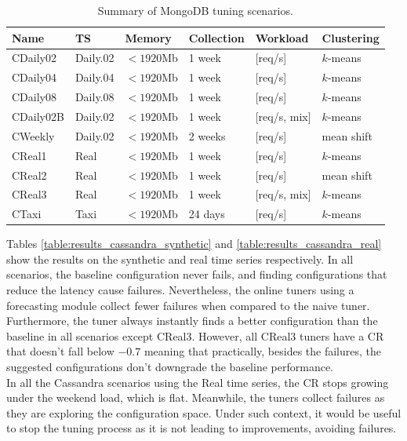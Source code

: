 \documentclass[a4paper, 12pt]{article} %
\newcommand{\ra}[1]{\renewcommand{\arraystretch}{#1}}
\begin{document}
	\begin{table}\centering 
		\ra{1.3}
		\begin{tabularx}{\textwidth}{@{}llllXX@{}}
			\midrule
			Name & TS & Memory & Collection & Workload & Clustering\\
			\midrule
			CDaily02&Daily.02 & $<1920$Mb  & 1 week & [req/s]  & $k$-means\\
			CDaily04&Daily.04 & $<1920$Mb  & 1 week & [req/s]  & $k$-means\\
			CDaily08&Daily.08 & $<1920$Mb  & 1 week & [req/s] & $k$-means\\
			CDaily02B&Daily.02 & $<1920$Mb  & 1 week & [req/s, mix] & $k$-means\\
			CWeekly&Daily.02 & $<1920$Mb  & 2 weeks & [req/s]  & mean shift\\
			CReal1&Real & $<1920$Mb  & 1 week & [req/s]  & $k$-means\\
			CReal2&Real & $<1920$Mb  & 1 week & [req/s]  & mean shift\\
			CReal3&Real & $<1920$Mb  & 1 week & [req/s, mix]  & $k$-means\\
			CTaxi &Taxi & $<1920$Mb  & 24 days & [req/s]  & $k$-means\\
			
			\bottomrule
		\end{tabularx}
		\caption{Summary of MongoDB tuning scenarios. }  \label{table:results_tuning_scenarios_cassandra}
	\end{table}
	
	Tables \ref{table:results_cassandra_synthetic} and \ref{table:results_cassandra_real} show the results on the synthetic and real time series respectively.
	In all scenarios, the baseline configuration never fails, and finding configurations that reduce the latency cause failures. Nevertheless, the online tuners using a forecasting module collect fewer failures when compared to the naive tuner. Furthermore, the tuner always instantly finds a better configuration than the baseline in all scenarios except CReal3. However, all CReal3 tuners have a CR that doesn't fall below $-0.7$ meaning that practically, besides the failures, the suggested configurations don't downgrade the baseline performance. \\
	In all the Cassandra scenarios using the Real time series, the CR stops growing under the weekend load, which is flat. Meanwhile, the tuners collect failures as they are exploring the configuration space. Under such context, it would be useful to stop the tuning process as it is not leading to improvements, avoiding failures.
	
\end{document}
